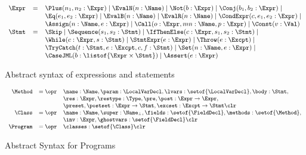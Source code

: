 \begin{figure}[t]
\[{\small
\begin{array}{rcl}
\Expr & = & \Plus(n_1, n_2 : \Expr) \mid
            \EvalN(n : \Name) \mid
            \Not(b : \Expr) \mid
            \Conj(b_1, b_2 : \Expr) \mid \\
      &   & \Eq(e_1, e_2 : \Expr) \mid
            \EvalB(n : \Name) \mid
            \EvalR(n : \Name) \mid
            \CondExpr(c, e_1, e_2 : \Expr) \mid\\
      &   & \Assign(n : \Name, e : \Expr) \mid
            \Call(o : \Expr, mn : \Name, p : \Expr) \mid
            \Const(v : \Val) \\
\Stmt & = & \Skip \mid
            \Sequence(s_1, s_2 : \Stmt) \mid
            \IfThenElse(c : \Expr, s_1, s_2 : \Stmt) \mid\\
      &   & \While(c : \Expr, s : \Stmt) \mid
            \StmtExpr(e : \Expr) \mid
            \Throw(e : \Excpt) \mid\\
      &   & \TryCatch(t: \Stmt, e : \Excpt, c, f : \Stmt) \mid
            \Set(n : \Name, e : \Expr) \mid\\
      &   & \CaseJML(b : \listof{\Expr \times \Stmt}) \mid
            \Assert(e : \Expr)
\end{array}}
\]
\caption{Abstract syntax of expressions and
statements}\label{FigExprStmt}
\end{figure}

\begin{figure}[t]
\[{\small
\begin{array}{rcl}
\Method & = \opr & \name : \Name,
                   \param : \LocalVarDecl,
                   \lvars : \setof{\LocalVarDecl},
                   \body : \Stmt,\\
        &        & \res : \Expr,
                   \restype : \Type,
                   \pre, \post : \Expr \rightarrow \Expr, \\
        &        & \preset, \postset : \Expr \rightarrow \Stmt,
                   \excset : \Excpt \rightarrow \Stmt \clr \\
\Class & = \opr & \name : \Name,
                  \super : \Name_{\bot},
                  \fields : \setof{\FieldDecl},
                  \methods : \setof{\Method},\\
        &       & \inv : \Expr,
                  \ghostvars : \setof{\FieldDecl} \clr\\
\Program & = \opr & \classes : \setof{\Class} \clr
\end{array}}
\]
\caption{Abstract Syntax for Programs}\label{FigProgram}
\end{figure}

